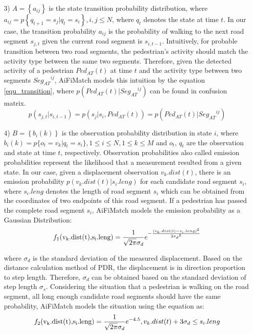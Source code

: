 \documentclass{llncs}
\begin{document}
3) $A = \left\{ {{a_{ij}}} \right\}$ is the state transition probability distribution, where \\ ${a_{ij}} = p\left\{ {{q_{t + 1}} = {s_j}|{q_t} = {s_i}} \right\}, i, j \le N$, where ${q_t}$ denotes the state at time $t$. In our case, the transition probability $a_{ij}$ is the probability of walking to the next road segment $s_{j,t}$ given the current road segment is $s_{i,t-1}$. Intuitively, for probable transition between two road segments, the pedestrian's activity should match the activity type between the same two segments. Therefore, given the detected activity of a pedestrian ${Ped_{AT}}(t)$ at time $t$ and the activity type between two segments ${Seg_{AT}}^{ij}$, AiFiMatch models this intuition by the equation \ref{equ_transition}, where $p({Ped_{AT}}(t)|{Seg_{AT}}^{ij})$ can be found in confusion matrix.
\begin{equation}
\label{equ_transition}
p({s_{j,t}}|{s_{i,t - 1}}) = p({s_j}|{s_i},{Ped_{AT}}(t)) = p({Ped_{AT}}(t)|{Seg_{AT}}^{ij})
\end{equation}

4) $B = \left\{ {{b_i}(k)} \right\}$ is the observation probability distribution in state $i$, where ${b_i}(k) = p\{ {o_t} = {v_k}|{q_t} = {s_i}\},1 \le i \le N,1 \le k \le M$ and $o_t$, $q_t$ are the observation and state at time $t$, respectively. Observation probabilities also called emission probabilities represent the likelihood that a measurement resulted from a given state. In our case, given a displacement observation ${v_k}.dist(t)$, there is an emission probability $p({v_k}.dist(t)|{s_i}.leng)$ for each candidate road segment $s_i$, where ${s_i}.leng$ denotes the length of road segment $s_i$ which can be obtained from the coordinates of two endpoints of this road segment. If a pedestrian has passed the complete road segment $s_i$, AiFiMatch models the emission probability as a Gaussian Distribution:
\begin{equation}
\label{equ_emission1}
{f_1}({\rm{v_k}}{\rm{.dist(t),}}{{\rm{s}}_{\rm{i}}}{\rm{.leng}}) = \frac{1}{{\sqrt {2\pi } {\sigma _d}}}{e^{ - \frac{{{{({v_k}.dist(t) - {s_i}.leng)}^2}}}{{2{{\sigma}_d}^2}}}}
\end{equation}

where ${\sigma}_d$ is the standard deviation of the measured displacement. Based on the distance calculation method of PDR, the displacement is in direction proportion to step length. Therefore, ${\sigma}_d$ can be obtained based on the standard deviation of step length ${\sigma}_s$. Considering the situation that a pedestrian is walking on the road segment, all long enough candidate road segments should have the same probability, AiFiMatch models the situation using the equation as:
\begin{equation}
{f_2}({\rm{v_k}}{\rm{.dist(t),}}{{\rm{s}}_{\rm{i}}}{\rm{.leng}}) = \frac{1}{{\sqrt {2\pi } {\sigma _d}}}{e^{-4.5}},{v_k}.dist(t) + 3{\sigma _d} \le {s_i}.leng
\end{equation}
\end{document}
